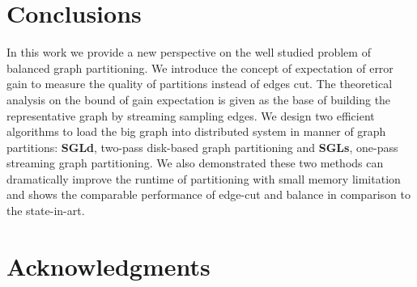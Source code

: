 \documentclass{sig-alternate-2013}
\begin{document}
\section{Conclusions}
In this work we provide a new perspective on the well studied problem of balanced graph partitioning. We introduce the concept of expectation of error gain to measure the quality of partitions instead of edges cut. The theoretical analysis on the bound of gain expectation is given as the base of building the representative graph by streaming sampling edges.  We design two efficient algorithms to load the big graph into distributed system in manner of graph partitions: \textbf{SGLd}, two-pass disk-based graph partitioning and \textbf{SGLs}, one-pass streaming graph partitioning. We also demonstrated these two methods can dramatically improve the runtime of partitioning with small memory limitation and shows the comparable performance of edge-cut and balance in comparison to the state-in-art.
\section{Acknowledgments}




\balancecolumns
\end{document}
